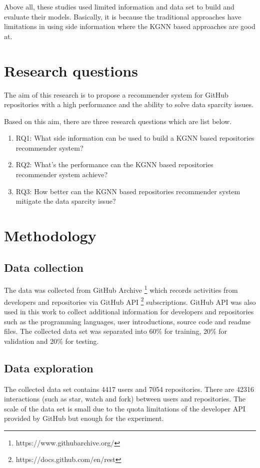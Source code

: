 \documentclass[11pt,twoside]{report}
\begin{document}
Above all, these studies used limited information and data set to build and evaluate their models. Basically, it is because the traditional approaches have limitations in using side information where the KGNN based approaches are good at.

\chapter{Research questions}
The aim of this research is to propose a recommender system for GitHub repositories with a high performance and the ability to solve data sparcity issues.

Based on this aim, there are three research questions which are list below.

\begin{enumerate}
    \item RQ1: What side information can be used to build a KGNN based repositories recommender system?
    \item RQ2: What’s the performance can the KGNN based repositories recommender system achieve?
    \item RQ3: How better can the KGNN based repositories recommender system mitigate the data sparcity issue?
\end{enumerate}

\chapter{Methodology}
\section{Data collection}
The data was collected from GitHub Archive \footnote{https://www.githubarchive.org/} which records activities from developers and repositories via GitHub API \footnote{https://docs.github.com/en/rest} subscriptions. GitHub API was also used in this work to collect additional information for developers and repositories such as the programming languages, user introductions, source code and readme files. The collected data set was separated into 60\% for training, 20\% for validation and 20\% for testing.

\section{Data exploration}
The collected data set contains 4417 users and 7054 repositories. There are 42316 interactions (such as star, watch and fork) between users and repositories. The scale of the data set is small due to the quota limitations of the developer API provided by GitHub but enough for the experiment.
\end{document}
